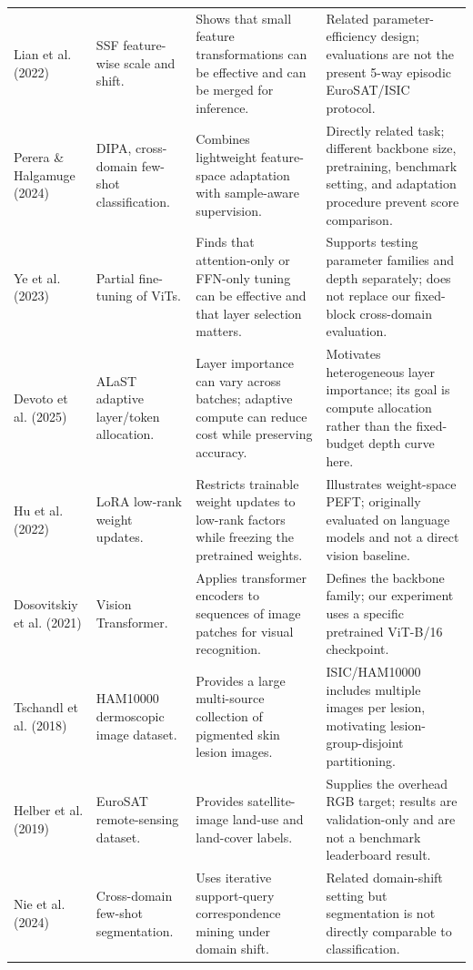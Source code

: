 \documentclass[11pt]{article}
\begin{document}
\begin{longtable}{P{0.13\textwidth}P{0.21\textwidth}P{0.28\textwidth}P{0.24\textwidth}}
Lian et al. (2022) \cite{lian2022} & SSF feature-wise scale and shift. & Shows that small feature transformations can be effective and can be merged for inference. & Related parameter-efficiency design; evaluations are not the present 5-way episodic EuroSAT/ISIC protocol.\\
Perera \& Halgamuge (2024) \cite{perera2024} & DIPA, cross-domain few-shot classification. & Combines lightweight feature-space adaptation with sample-aware supervision. & Directly related task; different backbone size, pretraining, benchmark setting, and adaptation procedure prevent score comparison.\\
Ye et al. (2023) \cite{ye2023} & Partial fine-tuning of ViTs. & Finds that attention-only or FFN-only tuning can be effective and that layer selection matters. & Supports testing parameter families and depth separately; does not replace our fixed-block cross-domain evaluation.\\
Devoto et al. (2025) \cite{devoto2025} & ALaST adaptive layer/token allocation. & Layer importance can vary across batches; adaptive compute can reduce cost while preserving accuracy. & Motivates heterogeneous layer importance; its goal is compute allocation rather than the fixed-budget depth curve here.\\
Hu et al. (2022) \cite{lora2022} & LoRA low-rank weight updates. & Restricts trainable weight updates to low-rank factors while freezing the pretrained weights. & Illustrates weight-space PEFT; originally evaluated on language models and not a direct vision baseline.\\
Dosovitskiy et al. (2021) \cite{vit2021} & Vision Transformer. & Applies transformer encoders to sequences of image patches for visual recognition. & Defines the backbone family; our experiment uses a specific pretrained ViT-B/16 checkpoint.\\
Tschandl et al. (2018) \cite{tschandl2018} & HAM10000 dermoscopic image dataset. & Provides a large multi-source collection of pigmented skin lesion images. & ISIC/HAM10000 includes multiple images per lesion, motivating lesion-group-disjoint partitioning.\\
Helber et al. (2019) \cite{helber2019} & EuroSAT remote-sensing dataset. & Provides satellite-image land-use and land-cover labels. & Supplies the overhead RGB target; results are validation-only and are not a benchmark leaderboard result.\\
Nie et al. (2024) \cite{nie2024} & Cross-domain few-shot segmentation. & Uses iterative support-query correspondence mining under domain shift. & Related domain-shift setting but segmentation is not directly comparable to classification.\\

\end{longtable}
\end{document}
